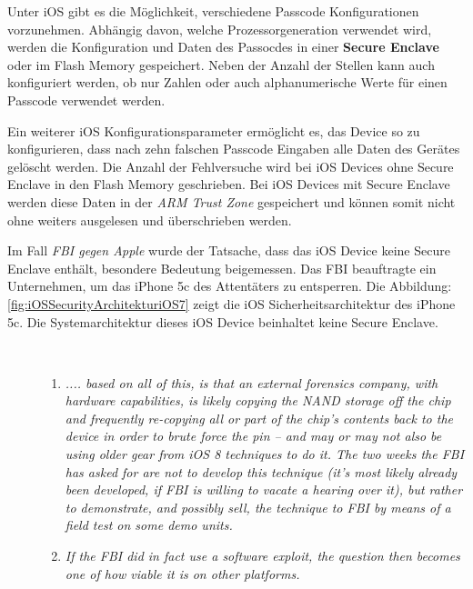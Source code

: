  Unter iOS gibt es die Möglichkeit, verschiedene Passcode Konfigurationen vorzunehmen. Abhängig davon, welche Prozessorgeneration verwendet wird, werden die Konfiguration und Daten des Passocdes in einer \textbf{Secure Enclave} oder im Flash Memory gespeichert. Neben der Anzahl der Stellen kann auch konfiguriert werden, ob nur Zahlen oder auch alphanumerische Werte für einen Passcode verwendet werden.\par 
 Ein weiterer iOS Konfigurationsparameter ermöglicht es, das Device so zu konfigurieren, dass nach zehn falschen Passcode Eingaben alle Daten des Gerätes gelöscht werden. Die Anzahl der Fehlversuche wird bei iOS Devices ohne Secure Enclave in den Flash Memory geschrieben. Bei iOS Devices mit Secure Enclave werden diese Daten in der \textit{\glqq ARM Trust Zone\grqq{}} gespeichert und können somit nicht ohne weiters ausgelesen und überschrieben werden. 
 
 
 Im Fall \textit{\glqq FBI gegen Apple\grqq{}} wurde der Tatsache, dass das iOS Device keine Secure Enclave enthält, besondere Bedeutung beigemessen. Das FBI beauftragte ein Unternehmen, um das iPhone 5c des Attentäters zu entsperren. Die Abbildung: \ref{fig:iOSSecurityArchitekturiOS7} zeigt die iOS Sicherheitsarchitektur des iPhone 5c. Die Systemarchitektur dieses iOS Device beinhaltet keine Secure Enclave. \par 
\begin{description}
    \item[\parbox{\textwidth} { Der Sicherheitsforscher Zdziarski beschreibt in seinen Abhandlungen die plausiblen Varianten des FBI Hacks wie folgt}]~\par
    \begin{enumerate}
        \item \textit{\glqq .... based on all of this, is that an external forensics company, with hardware capabilities, is likely copying the NAND storage off the chip and frequently re-copying all or part of the chip’s contents back to the device in order to brute force the pin – and may or may not also be using older gear from iOS 8 techniques to do it. The two weeks the FBI has asked for are not to develop this technique (it’s most likely already been developed, if FBI is willing to vacate a hearing over it), but rather to demonstrate, and possibly sell, the technique to FBI by means of a field test on some demo units.\grqq{}} \cite{Hacking[4]}
        \item \textit{\glqq If the FBI did in fact use a software exploit, the question then becomes one of how viable it is on other platforms.\grqq{}} \cite{Hacking[4]}
    \end{enumerate}
\end{description} 


